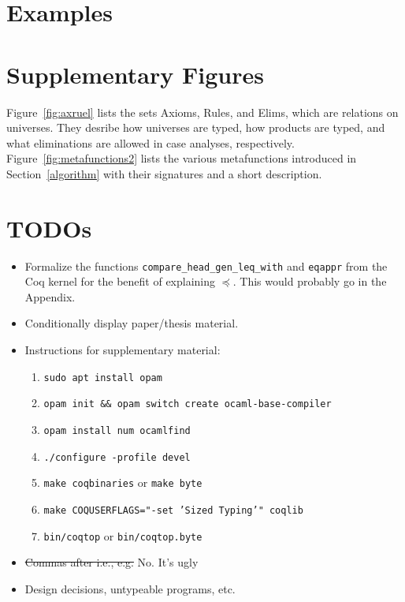 \documentclass[sigplan,10pt,anonymous,review,nonacm]{acmart}
\begin{document}



\clearpage
\appendix
\section{Examples}\label{examples}

\section{Supplementary Figures}\label{figures}




Figure~\ref{fig:axruel} lists the sets Axioms, Rules, and Elims, which are relations on universes. They desribe how universes are typed, how products are typed, and what eliminations are allowed in case analyses, respectively. Figure~\ref{fig:metafunctions2} lists the various metafunctions introduced in Section~\ref{algorithm} with their signatures and a short description.

\section{TODOs}
\begin{itemize}
    \item Formalize the functions \texttt{compare\_head\_gen\_leq\_with} and \texttt{eqappr} from the Coq kernel for the benefit of explaining $\preceq$. This would probably go in the Appendix.
    \item Conditionally display paper/thesis material.
    \item Instructions for supplementary material:
    \begin{enumerate}
        \item \texttt{sudo apt install opam}
        \item \texttt{opam init \&\& opam switch create ocaml-base-compiler}
        \item \texttt{opam install num ocamlfind}
        \item \texttt{./configure -profile devel}
        \item \texttt{make coqbinaries} or \texttt{make byte}
        \item \texttt{make COQUSERFLAGS="-set 'Sized Typing'" coqlib}
        \item \texttt{bin/coqtop} or \texttt{bin/coqtop.byte}
    \end{enumerate}
    \item \st{Commas after i.e., e.g.} No. It's ugly
    \item Design decisions, untypeable programs, etc.
\end{itemize}
\end{document}
